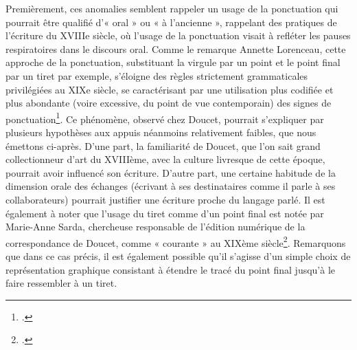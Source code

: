 Premièrement, ces anomalies semblent rappeler un usage de la ponctuation qui pourrait être qualifié d'« oral » ou « à l’ancienne », rappelant des pratiques de l’écriture du XVIIIe siècle, où l’usage de la ponctuation visait à refléter les pauses respiratoires dans le discours oral. Comme le remarque Annette Lorenceau, cette approche de la ponctuation, substituant la virgule par un point et le point final par un tiret par exemple, s'éloigne des règles strictement grammaticales privilégiées au XIXe siècle, se caractérisant par une utilisation plus codifiée et plus abondante (voire excessive, du point de vue contemporain) des signes de ponctuation\footcite[p.51]{lorenceau_ponctuation_1980}. Ce phénomène, observé chez Doucet, pourrait s'expliquer par plusieurs hypothèses aux appuis néanmoins relativement faibles, que nous émettons ci-après. D’une part, la familiarité de Doucet, que l’on sait grand collectionneur d’art du XVIIIème, avec la culture livresque de cette époque, pourrait avoir influencé son écriture. D'autre part, une certaine habitude de la dimension orale des échanges (écrivant à ses destinataires comme il parle à ses collaborateurs) pourrait justifier une écriture proche du langage parlé. Il est également à noter que l’usage du tiret comme d’un point final est notée par Marie-Anne Sarda, chercheuse responsable de l’édition numérique de la correspondance de Doucet, comme « courante » au XIXème siècle\footcite{carius_principes_2024}. Remarquons que dans ce cas précis, il est également possible qu’il s’agisse d’un simple choix de représentation graphique consistant à étendre le tracé du point final jusqu’à le faire ressembler à un tiret.

